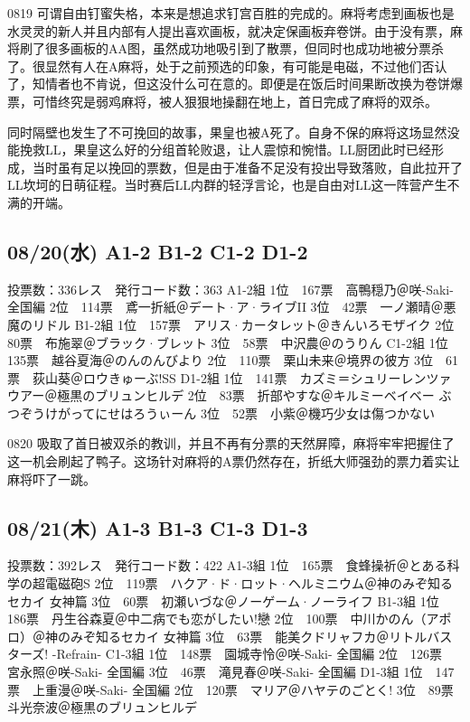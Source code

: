 0819 可谓自由钉蜜失格，本来是想追求钉宫百胜的完成的。麻将考虑到画板也是水灵灵的新人并且内部有人提出喜欢画板，就决定保画板弃卷饼。由于没有票，麻将刷了很多画板的AA图，虽然成功地吸引到了散票，但同时也成功地被分票杀了。很显然有人在A麻将，处于之前预选的印象，有可能是电磁，不过他们否认了，知情者也不肯说，但这没什么可在意的。即便是在饭后时间果断改换为卷饼爆票，可惜终究是弱鸡麻将，被人狠狠地操翻在地上，首日完成了麻将的双杀。

同时隔壁也发生了不可挽回的故事，果皇也被A死了。自身不保的麻将这场显然没能挽救LL，果皇这么好的分组首轮败退，让人震惊和惋惜。LL厨团此时已经形成，当时虽有足以挽回的票数，但是由于准备不足没有投出导致落败，自此拉开了LL坎坷的日萌征程。当时赛后LL内群的轻浮言论，也是自由对LL这一阵营产生不满的开端。

\subsection{08/20(水) A1-2 B1-2 C1-2 D1-2}

    投票数：336レス　発行コード数：363
    A1-2組
    1位　167票　高鴨穏乃＠咲-Saki- 全国編
    2位　114票　鳶一折紙＠デート·ア·ライブII
    3位　42票　一ノ瀬晴＠悪魔のリドル
    B1-2組
    1位　157票　アリス·カータレット＠きんいろモザイク
    2位　80票　布施翠＠ブラック·ブレット
    3位　58票　中沢農＠のうりん
    C1-2組
    1位　135票　越谷夏海＠のんのんびより
    2位　110票　栗山未来＠境界の彼方
    3位　61票　荻山葵＠ロウきゅーぶ!SS
    D1-2組
    1位　141票　カズミ＝シュリーレンツァウアー＠極黒のブリュンヒルデ
    2位　83票　折部やすな＠キルミーベイベー ぶつぞうけがってにせはろうぃーん
    3位　52票　小紫＠機巧少女は傷つかない

0820 吸取了首日被双杀的教训，并且不再有分票的天然屏障，麻将牢牢把握住了这一机会刷起了鸭子。这场针对麻将的A票仍然存在，折纸大师强劲的票力着实让麻将吓了一跳。

\subsection{08/21(木) A1-3 B1-3 C1-3 D1-3}

    投票数：392レス　発行コード数：422
    A1-3組
    1位　165票　食蜂操祈＠とある科学の超電磁砲S
    2位　119票　ハクア·ド·ロット·ヘルミニウム＠神のみぞ知るセカイ 女神篇
    3位　60票　初瀬いづな＠ノーゲーム·ノーライフ
    B1-3組
    1位　186票　丹生谷森夏＠中二病でも恋がしたい!戀
    2位　100票　中川かのん（アポロ）＠神のみぞ知るセカイ 女神篇
    3位　63票　能美クドリャフカ＠リトルバスターズ! -Refrain-
    C1-3組
    1位　148票　園城寺怜＠咲-Saki- 全国編
    2位　126票　宮永照＠咲-Saki- 全国編
    3位　46票　滝見春＠咲-Saki- 全国編
    D1-3組
    1位　147票　上重漫＠咲-Saki- 全国編
    2位　120票　マリア＠ハヤテのごとく!
    3位　89票　斗光奈波＠極黒のブリュンヒルデ

